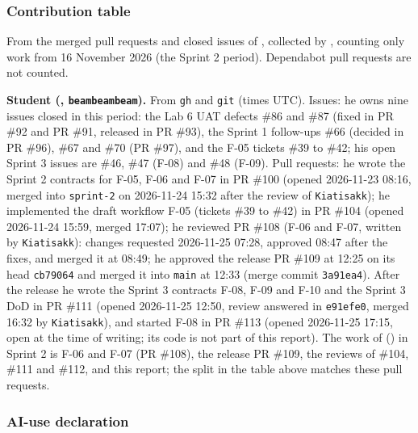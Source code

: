 \subsubsection*{Contribution table}

From the merged pull requests and closed issues of , collected by , counting only work from 16 November 2026 (the Sprint 2 period). Dependabot pull requests are not counted.



\textbf{Student \studentTwoId{} (\studentTwoName, \texttt{beambeambeam}).} From \texttt{gh} and \texttt{git} (times UTC). Issues: he owns nine issues closed in this period: the Lab 6 UAT defects \#86 and \#87 (fixed in PR \#92 and PR \#91, released in PR \#93), the Sprint 1 follow-ups \#66 (decided in PR \#96), \#67 and \#70 (PR \#97), and the F-05 tickets \#39 to \#42; his open Sprint 3 issues are \#46, \#47 (F-08) and \#48 (F-09). Pull requests: he wrote the Sprint 2 contracts for F-05, F-06 and F-07 in PR \#100 (opened 2026-11-23 08:16, merged into \texttt{sprint-2} on 2026-11-24 15:32 after the review of \texttt{Kiatisakk}); he implemented the draft workflow F-05 (tickets \#39 to \#42) in PR \#104 (opened 2026-11-24 15:59, merged 17:07); he reviewed PR \#108 (F-06 and F-07, written by \texttt{Kiatisakk}): changes requested 2026-11-25 07:28, approved 08:47 after the fixes, and merged it at 08:49; he approved the release PR \#109 at 12:25 on its head \texttt{cb79064} and merged it into \texttt{main} at 12:33 (merge commit \texttt{3a91ea4}). After the release he wrote the Sprint 3 contracts F-08, F-09 and F-10 and the Sprint 3 DoD in PR \#111 (opened 2026-11-25 12:50, review answered in \texttt{e91efe0}, merged 16:32 by \texttt{Kiatisakk}), and started F-08 in PR \#113 (opened 2026-11-25 17:15, open at the time of writing; its code is not part of this report). The work of \studentOneId{} (\studentOneName) in Sprint 2 is F-06 and F-07 (PR \#108), the release PR \#109, the reviews of \#104, \#111 and \#112, and this report; the split in the table above matches these pull requests.

\subsubsection*{AI-use declaration}

